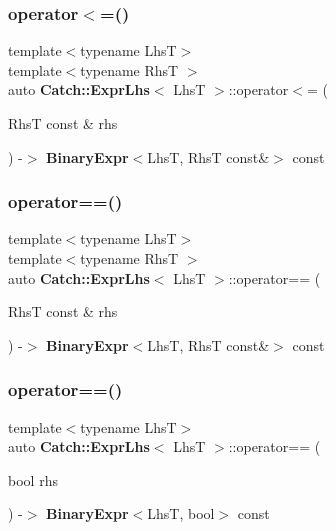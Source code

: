 \mbox{\label{class_catch_1_1_expr_lhs_a918090c28bee54222730159b56240af1}} 
\subsubsection{operator$<$=()}
{\footnotesize\ttfamily template$<$typename LhsT$>$ \\
template$<$typename RhsT $>$ \\
auto \textbf{ Catch\+::\+Expr\+Lhs}$<$ LhsT $>$\+::operator$<$= (\begin{DoxyParamCaption}\item[{RhsT const \&}]{rhs }\end{DoxyParamCaption}) -\/$>$ \textbf{ Binary\+Expr}$<$LhsT, RhsT const\&$>$ const \hspace{0.3cm}{\ttfamily [inline]}}

\mbox{\label{class_catch_1_1_expr_lhs_af218aaf7b5b0a0ebb6b3697f2c89893d}} 
\subsubsection{operator==()\hspace{0.1cm}{\footnotesize\ttfamily [1/2]}}
{\footnotesize\ttfamily template$<$typename LhsT$>$ \\
template$<$typename RhsT $>$ \\
auto \textbf{ Catch\+::\+Expr\+Lhs}$<$ LhsT $>$\+::operator== (\begin{DoxyParamCaption}\item[{RhsT const \&}]{rhs }\end{DoxyParamCaption}) -\/$>$ \textbf{ Binary\+Expr}$<$LhsT, RhsT const\&$>$ const \hspace{0.3cm}{\ttfamily [inline]}}

\mbox{\label{class_catch_1_1_expr_lhs_ab707a84abdffbdc35962a495e238d393}} 
\subsubsection{operator==()\hspace{0.1cm}{\footnotesize\ttfamily [2/2]}}
{\footnotesize\ttfamily template$<$typename LhsT$>$ \\
auto \textbf{ Catch\+::\+Expr\+Lhs}$<$ LhsT $>$\+::operator== (\begin{DoxyParamCaption}\item[{bool}]{rhs }\end{DoxyParamCaption}) -\/$>$ \textbf{ Binary\+Expr}$<$LhsT, bool$>$ const \hspace{0.3cm}{\ttfamily [inline]}}

